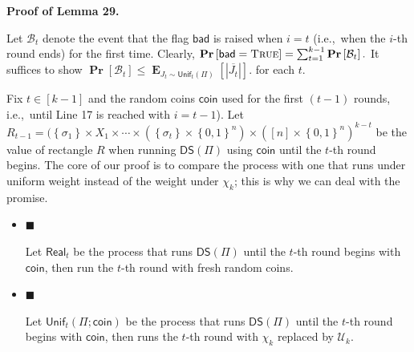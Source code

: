 \par\medskip\noindent\textbf{Proof of Lemma 29.}\par




Let $\mathcal{B}_{t}$ denote the event that the flag $\mathsf{bad}$ is raised when $i=t$ (i.e., when the $i$-th round ends) for the first time.
Clearly,
$\operatorname*{\mathbf{Pr}}\left[\mathsf{bad}=\textsc{True}\right]=\sum_{t=1}^{k-1}\operatorname*{\mathbf{Pr}}\left[\mathcal{B}_{t}\right].$
It suffices to show $\operatorname*{\mathbf{Pr}}\left[\mathcal{B}_{t}\right]\leq\operatorname*{\mathbf{E}}_{J_{t}\sim\mathsf{Unif}_{t}(\Pi)}\left[|\overline{J_{t}}|\right].$ for each $t$.\par




Fix $t\in[k-1]$ and the random coins $\mathsf{coin}$ used for the first $(t-1)$ rounds, i.e., until Line 17 is reached with $i=t-1$).
Let $R_{t-1}=(\left\{\sigma_{1}\right\}\times X_{1}\times\cdots\times(\left\{\sigma_{t}\right\}\times\left\{0,1\right\}^{n})\times([n]\times\left\{0,1\right\}^{n})^{k-t}$ be the value of rectangle $R$ when running $\mathsf{DS}(\Pi)$ using $\mathsf{coin}$ until the $t$-th round begins.
The core of our proof is to compare the process with one that runs under uniform weight instead of the weight under $\chi_{k}$; this is why we can deal with the promise.\par


\begin{itemize}


\item[] 
$\blacksquare$ 


Let $\mathsf{Real}_{t}$ be the process that runs $\mathsf{DS}(\Pi)$ until the $t$-th round begins with $\mathsf{coin}$, then run the $t$-th round with fresh random coins.\par





\item[] 
$\blacksquare$ 


Let $\mathsf{Unif}_{t}(\Pi;\mathsf{coin})$ be the process that
runs $\mathsf{DS}(\Pi)$ until the $t$-th round begins with $\mathsf{coin}$, then runs the $t$-th round with $\chi_{k}$ replaced by $\mathcal{U}_{k}$.\par





\end{itemize}




